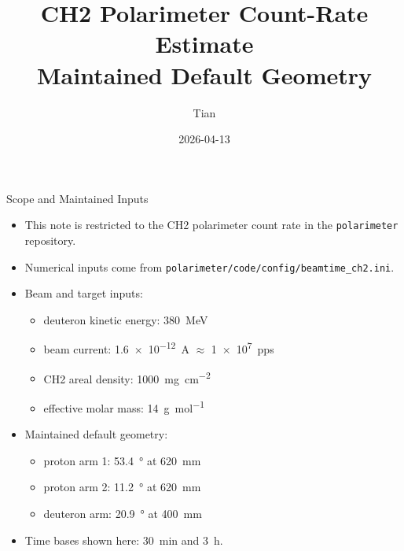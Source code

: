 \documentclass[aspectratio=169]{beamer}
\title[CH2 Count Rate]{CH2 Polarimeter Count-Rate Estimate\\Maintained Default Geometry}
\author{Tian}
\date{2026-04-13}
\begin{document}
\begin{frame}
\titlepage
\end{frame}

\begin{frame}{Scope and Maintained Inputs}
\small
\begin{itemize}
  \item This note is restricted to the CH2 polarimeter count rate in the \texttt{polarimeter} repository.
  \item Numerical inputs come from \texttt{polarimeter/code/config/beamtime\_ch2.ini}.
  \item Beam and target inputs:
  \begin{itemize}
    \item deuteron kinetic energy: \SI{380}{MeV}
    \item beam current: \SI{1.6e-12}{A} \(\approx\) \SI{1e7}{pps}
    \item CH2 areal density: \SI{1000}{mg.cm^{-2}}
    \item effective molar mass: \SI{14}{g.mol^{-1}}
  \end{itemize}
  \item Maintained default geometry:
  \begin{itemize}
    \item proton arm 1: \SI{53.4}{\degree} at \SI{620}{mm}
    \item proton arm 2: \SI{11.2}{\degree} at \SI{620}{mm}
    \item deuteron arm: \SI{20.9}{\degree} at \SI{400}{mm}
  \end{itemize}
  \item Time bases shown here: \SI{30}{min} and \SI{3}{h}.
\end{itemize}
\end{frame}
\end{document}
